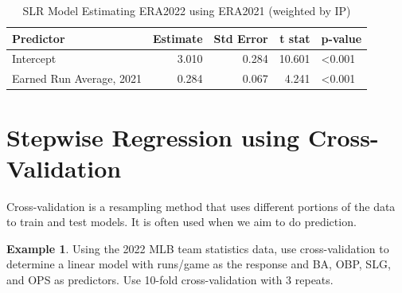 \documentclass[
  11pt,
]{book}
\theoremstyle{definition}
\theoremstyle{definition}
\newtheorem{example}{Example}[chapter]
\theoremstyle{definition}
\theoremstyle{definition}
\theoremstyle{remark}
\begin{document}
\begin{table}[!h]

\caption{\label{tab:unnamed-chunk-275}SLR Model Estimating ERA2022 using ERA2021 (weighted by IP)}
\centering
\begin{tabular}[t]{lrrrl}
\toprule
Predictor & Estimate & Std Error & t stat & p-value\\
\midrule
Intercept & 3.010 & 0.284 & 10.601 & <0.001\\
Earned Run Average, 2021 & 0.284 & 0.067 & 4.241 & <0.001\\
\bottomrule
\end{tabular}
\end{table}

\newpage

\hypertarget{stepwise-regression-using-cross-validation}{%
\section{Stepwise Regression using Cross-Validation}\label{stepwise-regression-using-cross-validation}}

Cross-validation is a resampling method that uses different portions of the data to train and test models. It is often used when we aim to do prediction.

\begin{example}
Using the 2022 MLB team statistics data, use cross-validation to determine a linear model with runs/game as the response and BA, OBP, SLG, and OPS as predictors. Use 10-fold cross-validation with 3 repeats.
\end{example}
\end{document}
